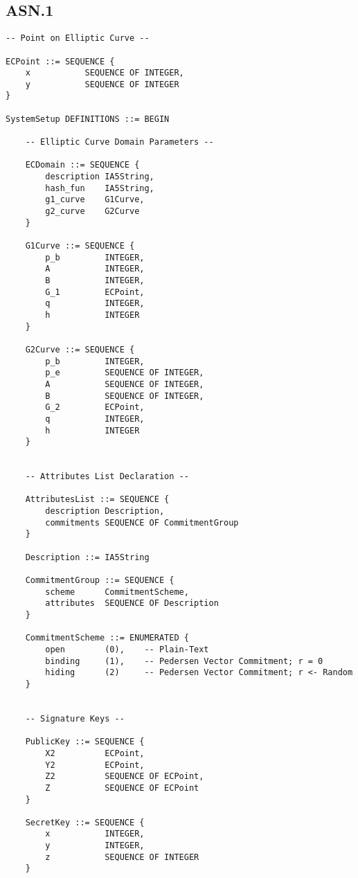 \subsection*{ASN.1}

\begin{verbatim}
-- Point on Elliptic Curve --

ECPoint ::= SEQUENCE {
    x           SEQUENCE OF INTEGER,
    y           SEQUENCE OF INTEGER
}

SystemSetup DEFINITIONS ::= BEGIN

    -- Elliptic Curve Domain Parameters --
    
    ECDomain ::= SEQUENCE {
        description IA5String,
        hash_fun    IA5String,
        g1_curve    G1Curve,
        g2_curve    G2Curve    
    }
    
    G1Curve ::= SEQUENCE {
        p_b         INTEGER,
        A           INTEGER,
        B           INTEGER,
        G_1         ECPoint,
        q           INTEGER,
        h           INTEGER
    }

    G2Curve ::= SEQUENCE {
        p_b         INTEGER,
        p_e         SEQUENCE OF INTEGER,
        A           SEQUENCE OF INTEGER,
        B           SEQUENCE OF INTEGER,
        G_2         ECPoint,
        q           INTEGER,
        h           INTEGER
    }
    
    
    -- Attributes List Declaration --

    AttributesList ::= SEQUENCE {
        description Description,
        commitments SEQUENCE OF CommitmentGroup
    }

    Description ::= IA5String

    CommitmentGroup ::= SEQUENCE {
        scheme      CommitmentScheme,
        attributes  SEQUENCE OF Description
    }

    CommitmentScheme ::= ENUMERATED {
        open        (0),    -- Plain-Text
        binding     (1),    -- Pedersen Vector Commitment; r = 0
        hiding      (2)     -- Pedersen Vector Commitment; r <- Random
    }

    
    -- Signature Keys --

    PublicKey ::= SEQUENCE {
        X2          ECPoint,
        Y2          ECPoint,
        Z2          SEQUENCE OF ECPoint,
        Z           SEQUENCE OF ECPoint
    }

    SecretKey ::= SEQUENCE {
        x           INTEGER,
        y           INTEGER,
        z           SEQUENCE OF INTEGER
    }


\end{verbatim}

